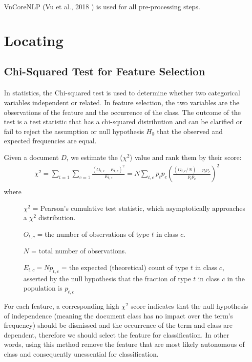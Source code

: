 VnCoreNLP (Vu et al., 2018 \cite{vu-etal-2018-vncorenlp}) is used for all pre-processing steps.

\section{Locating}
\label{sec:locating}
\subsection{Chi-Squared Test for Feature Selection}
\label{subsec:chi2}
\paragraph{}
In statistics, the Chi-squared test is used to determine whether two categorical variables independent or related. In feature selection, the two variables are the observations of the feature and the occurrence of the class. The outcome of the test is a test statistic that has a chi-squared distribution and can be clarified or fail to reject the assumption or null hypothesis \(H_{0}\) that the observed and expected frequencies are equal.

Given a document \(D\), we estimate the (\(\chi^{2}\)) value and rank them by their score:
\begin{eqnarray*}
\chi ^{2}= \sum_{t=1}^{}\sum_{c=1}^{}\frac{(O_{t,c}-E_{t,c})^{2}}{E_{t,c}} = N\sum_{t,c}^{}p_{t}p_{c}\left(\frac{(O_{t,c}/N)-p_{t}p_{c}}{p_{t}p_{c}}\right)^{2} \\
\end{eqnarray*}
where
\begin{description}
\item[] \(\chi^{2}\) = Pearson's cumulative test statistic, which asymptotically approaches a \(\chi^{2}\) distribution.
\item[] \(O_{t,c}\) = the number of observations of type \(t\) in class \(c\).
\item[]\(N\) = total number of observations.
\item[]\(E_{t,c} = Np_{t,c}\) = the expected (theoretical) count of type \(t\) in class \(c\), asserted by the null hypothesis that the fraction of type \(t\) in class \(c\) in the population is \(p_{t,c}\)
\end{description}

For each feature, a corresponding high \(\chi^{2}\) score indicates that the null hypothesis of independence (meaning the document class has no impact over the term's frequency) should be dismissed and the occurrence of the term and class are dependent, therefore we should select the feature for classification. In other words, using this method remove the feature that are most likely autonomous of class and consequently unessential for classification.

